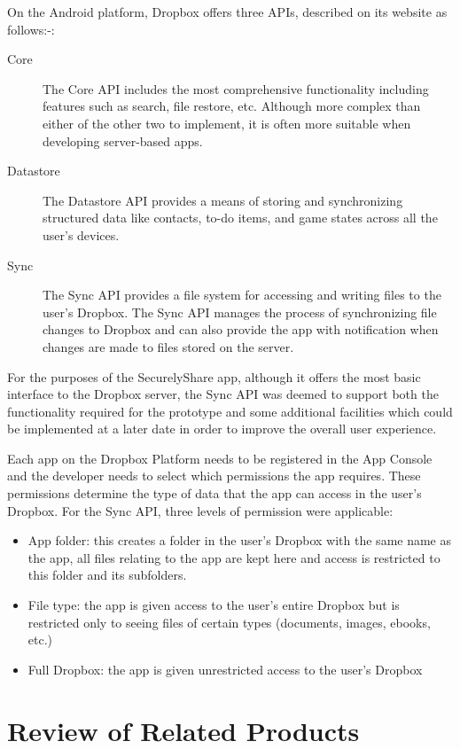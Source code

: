 On the Android platform, Dropbox offers three APIs, described on its website as follows:-:
\begin{description}
	\item[Core]The Core API includes the most comprehensive functionality including features such as search, file restore, etc. Although more complex than either of the other two to implement, it is often more suitable when developing server-based apps.
	\item[Datastore]The Datastore API provides a means of storing and synchronizing structured data like contacts, to-do items, and game states across  all the user's devices.
	\item[Sync]The Sync API provides a file system for accessing and writing files to the user's Dropbox.  The Sync API manages the process of synchronizing file changes to Dropbox and can also provide the app with notification when changes are made to files stored on the server.
\end{description}

For the purposes of the SecurelyShare app, although it offers the most basic interface to the Dropbox server, the Sync API was deemed to support both the functionality required for the prototype and some additional facilities which could be implemented at a later date in order to improve the overall user experience.

Each app on the Dropbox Platform needs to be registered in the App Console and the developer needs to select which permissions the app requires. These permissions determine the type of data that the app can access in the user's Dropbox.  For the Sync API, three levels of permission were applicable:
\begin{itemize}
\item App folder:  this creates a folder in the user's Dropbox with the same name as the app, all files relating to the app are kept here and access is restricted to this folder and its subfolders.
\item File type: the app is given access to the user's entire Dropbox but is restricted only to seeing files of certain types (documents, images, ebooks, etc.)  
\item Full Dropbox:  the app is given unrestricted access to the user's Dropbox

\end{itemize}



\section{Review of Related Products}

